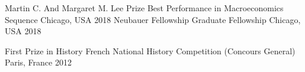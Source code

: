 

\begin{cvhonors}

    \cvhonor
    {Martin C. And Margaret M. Lee Prize} %
    {Best Performance in Macroeconomics Sequence} %
    {Chicago, USA} %
    {2018} %
    \cvhonor
    {Neubauer Fellowship} %
    {Graduate Fellowship} %
    {Chicago, USA} %
    {2018} %

    \cvhonor
    {First Prize in History} %
    {French National History Competition (Concours General)} %
    {Paris, France} %
    {2012} %

\end{cvhonors}

